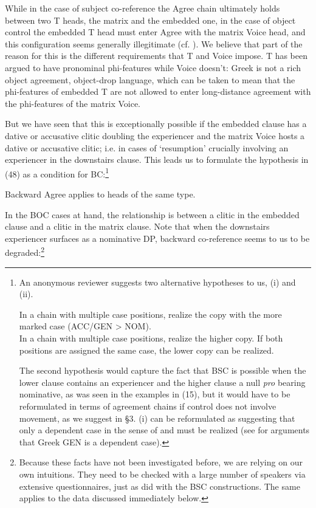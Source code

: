 \documentclass[output=paper]{langsci/langscibook}
\begin{document}
While in the case of subject co-reference the Agree chain ultimately holds between two T heads, the matrix and the embedded one, in the case of object control the embedded T head must enter Agree with the matrix Voice head, and this configuration seems generally illegitimate (cf. \citealt{Kayne1989}). We believe that part of the reason for this is the different requirements that T and Voice impose. T has been argued to have pronominal phi-features while Voice doesn’t: Greek is not a rich object agreement, object-drop language, which can be taken to mean that the phi-features of embedded T are not allowed to enter long-distance agreement with the phi-features of the matrix Voice. 

But we have seen that this is exceptionally possible if the embedded clause has a dative or accusative clitic doubling the experiencer and the matrix Voice hosts a dative or accusative clitic; i.e. in cases of ‘resumption’ crucially involving an experiencer in the downstairs clause. This leads us to formulate the hypothesis in (48) as a condition for BC:\footnote{An anonymous reviewer suggests two alternative hypotheses to us, (i) and (ii).

\ea \glt In a chain with multiple case positions, realize the copy with the more marked case (ACC\slash GEN > NOM).\\
\z
\ea \glt In a chain with multiple case positions, realize the higher copy. If both positions are assigned the same case, the lower copy can be realized.\\
\z    

The second hypothesis would capture the fact that BSC is possible when the lower clause contains an experiencer and the higher clause a null \textit{pro} bearing nominative, as was seen in the examples in (15), but it would have to be reformulated in terms of agreement chains if control does not involve movement, as we suggest in §3. (i) can be reformulated as suggesting that only a dependent case in the sense of \citet{Marantz1991} and \citet{Baker2015} must be realized (see \citealt{Anagnostopoulou2017} for arguments that Greek GEN is a dependent case).}

\ea%
    \label{ex:alexiadou:55}
    Backward Agree applies to heads of the same type. 
\z

In the BOC cases at hand, the relationship is between a clitic in the embedded clause and a clitic in the matrix clause. Note that when the downstairs experiencer surfaces as a nominative DP, backward co-reference seems to us to be degraded:\footnote{Because these facts have not been investigated before, we are relying on our own intuitions. They need to be checked with a large number of speakers via extensive questionnaires, just as \citet{Tsakali2017} did with the BSC constructions. The same applies to the data discussed immediately below.} 
\end{document}
